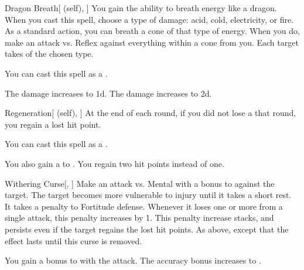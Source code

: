 \lowercase{\hypertarget{spell:Dragon Breath}{}}\label{spell:Dragon Breath}
\begin{attuneability}[Rank 4]{\hypertarget{spell:Dragon Breath}{Dragon Breath}}[ (self), ]
You gain the ability to breath energy like a dragon.
When you cast this spell, choose a type of damage: acid, cold, electricity, or fire.
As a standard action, you can breath a cone of that type of energy.
When you do, make an attack vs. Reflex against everything within a \arealarge cone from you.
\hit Each target takes  of the chosen type.

You can cast this spell as a .

\rankline
{} The damage increases to  \plus1d.
 The damage increases to  \plus2d.

\end{attuneability}
\vspace{0.25em}



\lowercase{\hypertarget{spell:Regeneration}{}}\label{spell:Regeneration}
\begin{attuneability}[Rank 4]{\hypertarget{spell:Regeneration}{Regeneration}}[ (self), ]
At the end of each round, if you did not lose a  that round, you regain a lost hit point.

You can cast this spell as a .

\rankline
{} You also gain a   to .
 You regain two hit points instead of one.

\end{attuneability}
\vspace{0.25em}



\lowercase{\hypertarget{spell:Withering Curse}{}}\label{spell:Withering Curse}
\begin{freeability}[Rank 4]{\hypertarget{spell:Withering Curse}{Withering Curse}}[, ]
Make an attack vs. Mental with a  bonus to  against the target.
\hit The target becomes more vulnerable to injury until it takes a short rest.
It takes a  penalty to Fortitude defense.
Whenever it loses one or more  from a single attack, this penalty increases by 1.
This penalty increase stacks, and persists even if the target regains the lost hit points.
\crit As above, except that the effect lasts until this curse is removed.

\rankline
{} You gain a  bonus to  with the attack.
 The accuracy bonus increases to .

\end{freeability}
\vspace{0.25em}



